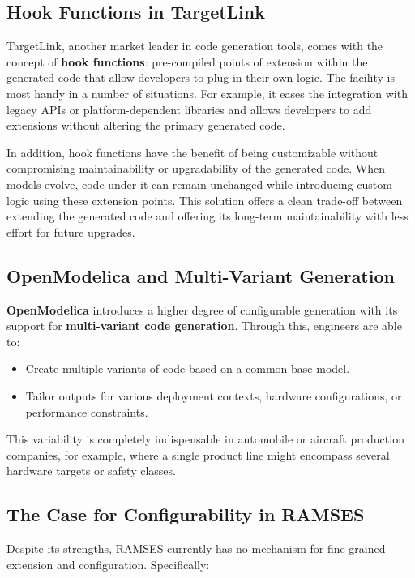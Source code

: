 \subsection*{Hook Functions in TargetLink}

TargetLink, another market leader in code generation tools, comes with the concept of \textbf{hook functions}: pre-compiled points of extension within the generated code that allow developers to plug in their own logic. The facility is most handy in a number of situations. For example, it eases the integration with legacy APIs or platform-dependent libraries and allows developers to add extensions without altering the primary generated code.
\par
In addition, hook functions have the benefit of being customizable without compromising maintainability or upgradability of the generated code. When models evolve, code under it can remain unchanged while introducing custom logic using these extension points. This solution offers a clean trade-off between extending the generated code and offering its long-term maintainability with less effort for future upgrades.

\subsection*{OpenModelica and Multi-Variant Generation}

\textbf{OpenModelica} introduces a higher degree of configurable generation with its support for \textbf{multi-variant code generation}. Through this, engineers are able to:
\begin{itemize} 
	\item Create multiple variants of code based on a common base model.
	\item Tailor outputs for various deployment contexts, hardware configurations, or performance constraints.
\end{itemize}

This variability is completely indispensable in automobile or aircraft production companies, for example, where a single product line might encompass several hardware targets or safety classes.


\subsection*{The Case for Configurability in RAMSES}

Despite its strengths, RAMSES currently has no mechanism for fine-grained extension and configuration.
Specifically:

